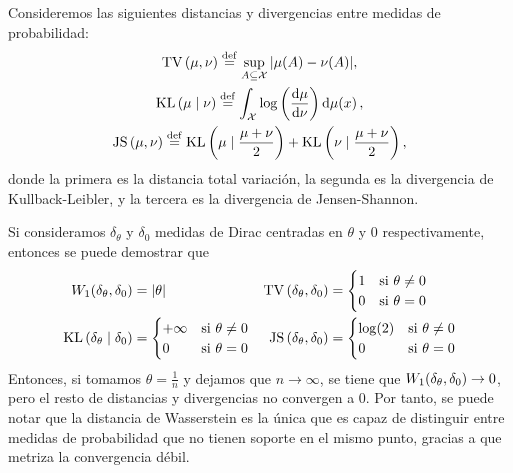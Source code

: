 {{	  \begin{example}
		  Consideremos las siguientes distancias y divergencias entre medidas de probabilidad:
		  \begin{gather*}
			  \TV{\mu}{\nu} \eqdef \sup_{A \subseteq \cX} \abs{\mu(A) - \nu(A)}, \\
			  \KL{\mu}{\nu} \eqdef \int_{\cX} \log\left(\dv{\mu}{\nu}(x)\right) \dmu[x], \\
			  \JS{\mu}{\nu} \eqdef \KL{\mu}{\frac{\mu + \nu}{2}} + \KL{\nu}{\frac{\mu + \nu}{2}},
		  \end{gather*}
		  donde la primera es la distancia total variación, la segunda es la divergencia de Kullback-Leibler, y la tercera es la divergencia de Jensen-Shannon.

		  Si consideramos $\delta_\theta$ y $\delta_0$ medidas de Dirac centradas en $\theta$ y $0$ respectivamente, entonces se puede demostrar que
		  \begin{align*}
			  \Wasserstein[1]{\delta_\theta}{\delta_0} & = |\theta|                            &
			  \TV{\delta_\theta}{\delta_0}             & = \begin{cases}
				                                               1 & \text{si } \theta \neq 0 \\
				                                               0 & \text{si } \theta = 0
			                                               \end{cases}          \\
			  \KL{\delta_\theta}{\delta_0}             & = \begin{cases}
				                                               +\infty & \text{si } \theta \neq 0 \\
				                                               0       & \text{si } \theta = 0
			                                               \end{cases} &
			  \JS{\delta_\theta}{\delta_0}             & = \begin{cases}
				                                               \log(2) & \text{si } \theta \neq 0 \\
				                                               0       & \text{si } \theta = 0
			                                               \end{cases}
		  \end{align*}
		  Entonces, si tomamos $\theta = \frac{1}{n} $ y dejamos que $n \to \infty$, se tiene que $\Wasserstein[1]{\delta_\theta}{\delta_0} \to 0$, pero el resto de distancias y divergencias no convergen a 0.
		  Por tanto, se puede notar que la distancia de Wasserstein es la única que es capaz de distinguir entre medidas de probabilidad que no tienen soporte en el mismo punto, gracias a que metriza la convergencia débil.
	  \end{example}

}}
